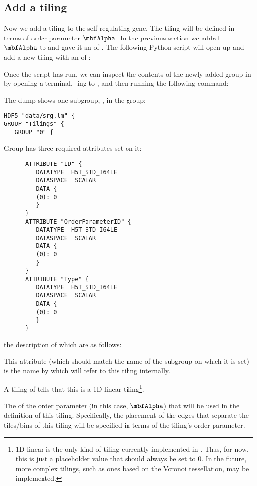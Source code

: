 {\subsection{Add a tiling}\label{sec:add_tiling_srg}
Now we add a tiling to the self regulating gene. The tiling will be defined in terms of order parameter $\oparama$. In the previous section we added $\oparama$ to \pth{\lm} and gave it an  of . The following Python script will open up \pth{\lm} and add a new tiling with an  of :


Once the script has run, we can inspect the contents of the newly added  group in \pth{\lm} by opening a terminal, -ing to \pth{\dir}, and then running the following command:


The dump shows one subgroup, , in the  group:
\begin{verbatim}
HDF5 "data/srg.lm" {
GROUP "Tilings" {
   GROUP "0" {
\end{verbatim}

Group  has three required attributes set on it:
\begin{verbatim}
      ATTRIBUTE "ID" {
         DATATYPE  H5T_STD_I64LE
         DATASPACE  SCALAR
         DATA {
         (0): 0
         }
      }
      ATTRIBUTE "OrderParameterID" {
         DATATYPE  H5T_STD_I64LE
         DATASPACE  SCALAR
         DATA {
         (0): 0
         }
      }
      ATTRIBUTE "Type" {
         DATATYPE  H5T_STD_I64LE
         DATASPACE  SCALAR
         DATA {
         (0): 0
         }
      }
\end{verbatim}
the description of which are as follows:
\begin{description}[style=nextline]
    \item[\code{\tilingid}] This attribute (which should match the name of the  subgroup on which it is set) is the name by which  will refer to this tiling internally.
    \item[\code{\tilingtype}] A tiling \code{\tilingtype} of  tells  that this is a 1D linear tiling\footnote{1D linear is the only kind of tiling currently implemented in . Thus, for now, this is just a placeholder value that should always be set to 0. In the future, more complex tilings, such as ones based on the Voronoi tessellation\cite{Dickson:2009gt}, may be implemented.}.
    \item[\code{\tilingopid}] The \code{\oparamid} of the order parameter (in this case, $\oparama$) that will be used in the definition of this tiling. Specifically, the placement of the edges that separate the tiles/bins of this tiling will be specified in terms of the tiling's order parameter.
\end{description}

}
